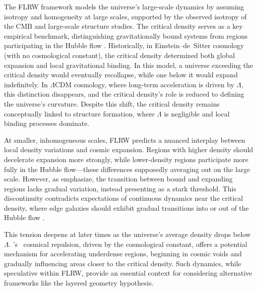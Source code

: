 \documentclass[aps,rmp,groupedaddress,twocolumn,10pt]{revtex4-2}
\begin{document}
The FLRW framework models the universe's large-scale dynamics by assuming isotropy and homogeneity at large scales, supported by the observed isotropy of the CMB and large-scale structure studies. The critical density serves as a key empirical benchmark, distinguishing gravitationally bound systems from regions participating in the Hubble flow \cite{Nagamine2003}. Historically, in Einstein–de~Sitter cosmology (with no cosmological constant), the critical density determined both global expansion and local gravitational binding. In this model, a universe exceeding the critical density would eventually recollapse, while one below it would expand indefinitely. In $\Lambda$CDM cosmology, where long-term acceleration is driven by \(\Lambda\), this distinction disappears, and the critical density's role is reduced to defining the universe's curvature. Despite this shift, the critical density remains conceptually linked to structure formation, where \(\Lambda\) is negligible and local binding processes dominate.

At smaller, inhomogeneous scales, FLRW predicts a nuanced interplay between local density variations and cosmic expansion. Regions with higher density should decelerate expansion more strongly, while lower-density regions participate more fully in the Hubble flow---these differences supposedly averaging out on the large scale. However, as \citet{Paraskevas2024} emphasize, the transition between bound and expanding regions lacks gradual variation, instead presenting as a stark threshold. This discontinuity contradicts expectations of continuous dynamics near the critical density, where edge galaxies should exhibit gradual transitions into or out of the Hubble flow \cite{Wang2023}.

This tension deepens at later times as the universe's average density drops below $\Lambda$. \citeauthor{Eddington1933}'s~\citeyearpar{Eddington1933} cosmical repulsion, driven by the cosmological constant, offers a potential mechanism for accelerating underdense regions, beginning in cosmic voids and gradually influencing areas closer to the critical density. Such dynamics, while speculative within FLRW, provide an essential context for considering alternative frameworks like the layered geometry hypothesis.
\end{document}

